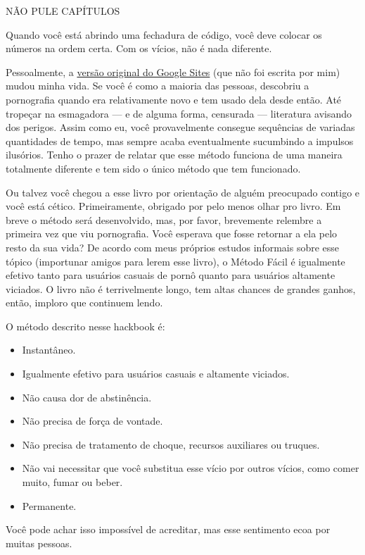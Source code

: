 \documentclass[
  spanish,
  openany]{book}
\providecommand{\tightlist}{%
  \setlength{\itemsep}{0pt}\setlength{\parskip}{0pt}}
\let\oldhref\href
\renewcommand{\href}[2]{\textcolor{linkcolor}{\oldhref{#1}{#2}}}
\begin{document}
{NÃO PULE CAPÍTULOS}

Quando você está abrindo uma fechadura de código, você deve colocar os números na ordem certa. Com os vícios, não é nada diferente.

Pessoalmente, a \href{https://web.archive.org/web/20201014165025/https://sites.google.com/site/hackbookeasypeasy/}{versão original do Google Sites} (que não foi escrita por mim) mudou minha vida. Se você é como a maioria das pessoas, descobriu a pornografia quando era relativamente novo e tem usado dela desde então. Até tropeçar na esmagadora --- e de alguma forma, censurada ---
literatura avisando dos perigos. Assim como eu, você provavelmente consegue sequências de variadas quantidades de tempo, mas sempre acaba eventualmente sucumbindo a impulsos ilusórios. Tenho o prazer de relatar que esse método funciona de uma maneira totalmente diferente e tem sido o único método que tem funcionado.

Ou talvez você chegou a esse livro por orientação de alguém preocupado contigo e você está cético. Primeiramente, obrigado por pelo menos olhar pro livro. Em breve o método será desenvolvido, mas, por favor, brevemente relembre a primeira vez que viu pornografia. Você esperava que fosse retornar a ela pelo resto da sua vida? De acordo com meus próprios estudos informais sobre esse tópico (importunar amigos para lerem esse livro), o Método Fácil é igualmente efetivo tanto para usuários casuais de pornô quanto para usuários altamente viciados. O livro não é terrivelmente longo, tem altas chances de grandes ganhos, então, imploro que continuem lendo.

O método descrito nesse hackbook é:

\begin{itemize}
\tightlist
\item
  Instantâneo.
\item
  Igualmente efetivo para usuários casuais e altamente viciados.
\item
  Não causa dor de abstinência.
\item
  Não precisa de força de vontade.
\item
  Não precisa de tratamento de choque, recursos auxiliares ou truques.
\item
  Não vai necessitar que você substitua esse vício por outros vícios, como comer muito, fumar ou beber.
\item
  Permanente.
\end{itemize}

Você pode achar isso impossível de acreditar, mas esse sentimento ecoa por muitas pessoas.
\end{document}
